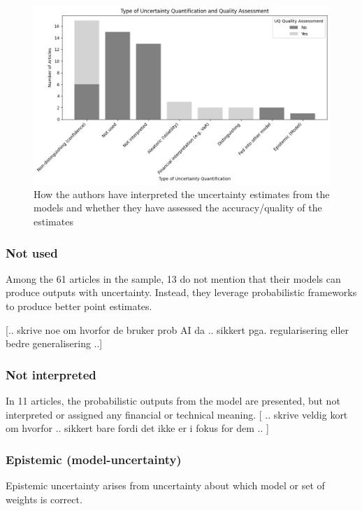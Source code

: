 \begin{figure}[H]
    \centering
    \includegraphics[width=1\linewidth]{Images/uncertainty_quantification_by_type_and_assessment.png}
    \caption{How the authors have interpreted the uncertainty estimates from the models and whether they have assessed the accuracy/quality of the estimates}
    \label{fig:uncertainty_quantification_by_type_and_assessment}
\end{figure}


\subsubsection{Not used}

Among the 61 articles in the sample, 13 do not mention that their models can produce outputs with uncertainty. Instead, they leverage probabilistic frameworks to produce better point estimates.


[.. skrive noe om hvorfor de bruker prob AI da .. sikkert pga. regularisering eller bedre generalisering ..]

\subsubsection{Not interpreted}

In 11 articles, the probabilistic outputs from the model are presented, but not interpreted or assigned any financial or technical meaning. [ .. skrive veldig kort om hvorfor .. sikkert bare fordi det ikke er i fokus for dem .. ]


\subsubsection{Epistemic (model-uncertainty)}
Epistemic uncertainty arises from uncertainty about which model or set of weights is correct.

